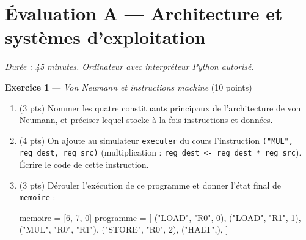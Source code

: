 \section*{Évaluation A --- Architecture et systèmes d'exploitation}
\textit{Durée : 45 minutes. Ordinateur avec interpréteur Python autorisé.}


\bigskip

\textbf{Exercice 1} --- \textit{Von Neumann et instructions machine} \hfill (10 points)

\begin{enumerate}
  \item (3 pts) Nommer les quatre constituants principaux de l'architecture de von Neumann, et préciser lequel stocke à la fois instructions et données.
  \item (4 pts) On ajoute au simulateur \lstinline{executer} du cours l'instruction \lstinline{("MUL", reg_dest, reg_src)} (multiplication : \lstinline{reg_dest <- reg_dest * reg_src}). Écrire le code de cette instruction.
  \item (3 pts) Dérouler l'exécution de ce programme et donner l'état final de \lstinline{memoire} :
\begin{python}
memoire = [6, 7, 0]
programme = [
    ("LOAD", "R0", 0),
    ("LOAD", "R1", 1),
    ("MUL", "R0", "R1"),
    ("STORE", "R0", 2),
    ("HALT",),
]
\end{python}
\end{enumerate}



